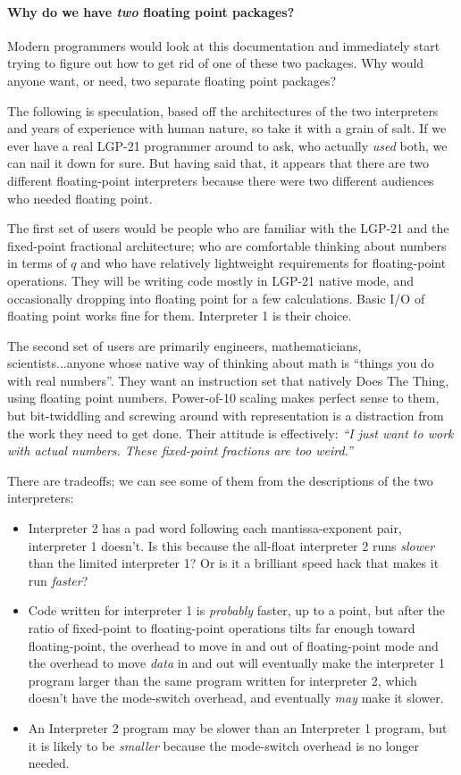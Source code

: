 \paragraph{Why do we have \emph{two} floating point packages?}
Modern programmers would look at this documentation and immediately start trying to figure out how to get rid of one of these two packages. Why would anyone want, or need, two separate floating point packages?

The following is speculation, based off the architectures of the two interpreters and years of experience with human nature, so take it with a grain of salt. If we ever have a real LGP-21 programmer around to ask, who actually \emph{used} both, we can nail it down for sure. But having said that, it appears that there are two different floating-point interpreters because there were two different audiences who needed floating point.

The first set of users would be people who are familiar with the LGP-21 and the fixed-point fractional architecture; who are comfortable thinking about numbers in terms of $q$ and who have relatively lightweight requirements for floating-point operations. They will be writing code mostly in LGP-21 native mode, and occasionally dropping into floating point for a few calculations. Basic I/O of floating point works fine for them. Interpreter 1 is their choice.

The second set of users are primarily engineers, mathematicians, scientists...anyone whose native way of thinking about math is ``things you do with real numbers''. They want an instruction set that natively Does The Thing, using floating point numbers. Power-of-10 scaling makes perfect sense to them, but bit-twiddling and screwing around with representation is a distraction from the work they need to get done. Their attitude is effectively: \emph{``I just want to work with actual numbers. These fixed-point fractions are too weird.''}

There are tradeoffs; we can see some of them from the descriptions of the two interpreters:
\begin{itemize} 
	\item Interpreter 2 has a pad word following each mantissa-exponent pair, interpreter 1 doesn't. Is this because the all-float interpreter 2 runs \emph{slower} than the limited interpreter 1? Or is it a brilliant speed hack that makes it run \emph{faster}? 
	\item Code written for interpreter 1 is \emph{probably} faster, up to a point, but after the ratio of fixed-point to floating-point operations tilts far enough toward floating-point, the overhead to move in and out of floating-point mode and the overhead to move \emph{data} in and out will eventually make the interpreter 1 program larger than the same program written for interpreter 2, which doesn't have the mode-switch overhead, and eventually \emph{may} make it slower.
	\item An Interpreter 2 program may be slower than an Interpreter 1 program, but it is likely to be \emph{smaller} because the mode-switch overhead is no longer needed.
\end{itemize}

